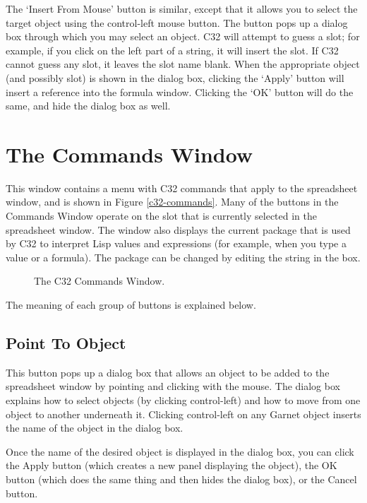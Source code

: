 The `Insert From Mouse' button is similar, except that it allows you to
select the target object using the control-left mouse button.  The button
pops up a dialog box through which you may select an object.  C32 will
attempt to guess a slot; for example, if you click  on
the left part of a string, it will insert the  slot.  If C32
cannot guess any slot, it leaves the slot name blank.  When the
appropriate object (and possibly slot) is shown in the dialog box,
clicking the `Apply' button will insert a reference into the formula
window.  Clicking the `OK' button will do the same, and hide the dialog
box as well.



\chapter{The Commands Window}

This window contains a menu with C32 commands that apply to the
spreadsheet window, and is shown in Figure \ref{c32-commands}.  Many of
the buttons in the Commands Window operate on the slot that is currently
selected in the spreadsheet window.  The window also displays the current
package that is used by C32 to interpret Lisp values and expressions (for
example, when you type a value or a formula).  The package can be changed
by editing the string in the box.

\begin{figure}
\begin{center}
\end{center}
\caption{The C32 Commands Window.}
\end{figure}

The meaning of each group of buttons is explained below.

\section{Point To Object}

This button pops up a dialog box that allows an object to be added to the
spreadsheet window by pointing and clicking with the mouse.  The dialog
box explains how to select objects (by clicking control-left) and how to
move from one object to another underneath it.  Clicking control-left on
any Garnet object inserts the name of the object in the dialog box.

Once the name of the desired object is displayed in the dialog box, you
can click the Apply button (which creates a new panel displaying the
object), the OK button (which does the same thing and then hides the
dialog box), or the Cancel button.

